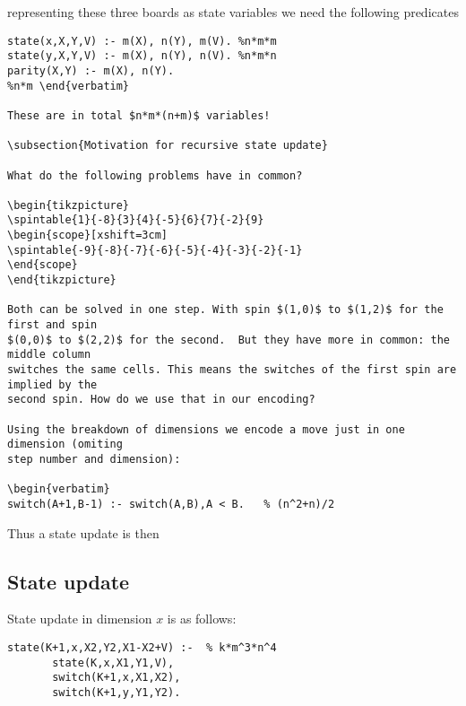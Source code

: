 \documentclass[]{llncs}
\newcommand{\spintable}[9]{ 
\node [matrix,ampersand replacement=\&,nodes={minimum size=4mm}]
{
    \node {#1}; \& \node{#2}; \& \node {#3}; \\ 
    \node {#4}; \& \node{#5}; \& \node {#6}; \\ 
    \node {#7}; \& \node{#8}; \& \node {#9}; \\ 
}; 
}
\begin{document}
representing these three boards as state variables we need the following predicates

\begin{verbatim} 
state(x,X,Y,V) :- m(X), n(Y), m(V). %n*m*m 
state(y,X,Y,V) :- m(X), n(Y), n(V). %n*m*n 
parity(X,Y) :- m(X), n(Y).
%n*m \end{verbatim}

These are in total $n*m*(n+m)$ variables!

\subsection{Motivation for recursive state update}

What do the following problems have in common? 

\begin{tikzpicture} 
\spintable{1}{-8}{3}{4}{-5}{6}{7}{-2}{9}
\begin{scope}[xshift=3cm] 
\spintable{-9}{-8}{-7}{-6}{-5}{-4}{-3}{-2}{-1} 
\end{scope}
\end{tikzpicture}

Both can be solved in one step. With spin $(1,0)$ to $(1,2)$ for the first and spin
$(0,0)$ to $(2,2)$ for the second.  But they have more in common: the middle column
switches the same cells. This means the switches of the first spin are implied by the
second spin. How do we use that in our encoding?

Using the breakdown of dimensions we encode a move just in one dimension (omiting
step number and dimension):

\begin{verbatim} 
switch(A+1,B-1) :- switch(A,B),A < B.   % (n^2+n)/2 
\end{verbatim}

Thus a state update is then 


\subsection{State update} State update in dimension $x$ is as follows:

\begin{verbatim} 
state(K+1,x,X2,Y2,X1-X2+V) :-  % k*m^3*n^4 
       state(K,x,X1,Y1,V),
       switch(K+1,x,X1,X2), 
       switch(K+1,y,Y1,Y2).  
\end{verbatim}
\end{document}
